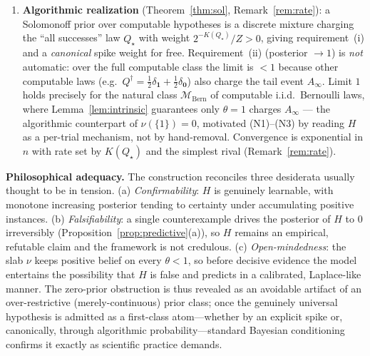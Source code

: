 \documentclass{amsart}
\theoremstyle{definition}
\begin{document}
\begin{enumerate}
\item \textbf{Algorithmic realization} (Theorem~\ref{thm:sol},
Remark~\ref{rem:rate}): a Solomonoff prior over computable hypotheses is a
discrete mixture charging the ``all successes'' law $Q_\star$ with weight
$2^{-K(Q_\star)}/Z>0$, giving requirement~(i) and a \emph{canonical} spike weight
for free. Requirement~(ii) (posterior $\to1$) is \emph{not} automatic: over the
full computable class the limit is $<1$ because other computable laws (e.g.\
$Q^{\dagger}=\tfrac12\delta_{\mathbf 1}+\tfrac12\delta_{\mathbf 0}$) also charge
the tail event $A_\infty$. Limit $1$ holds precisely for the natural class
$\mathcal M_{\mathrm{Bern}}$ of computable i.i.d.\ Bernoulli laws, where
Lemma~\ref{lem:intrinsic} guarantees only $\theta=1$ charges $A_\infty$ --- the
algorithmic counterpart of $\nu(\{1\})=0$, motivated (N1)--(N3) by reading $H$ as a
per-trial mechanism, not by hand-removal. Convergence is exponential in $n$ with
rate set by $K(Q_\star)$ and the simplest rival (Remark~\ref{rem:rate}).
\end{enumerate}

\noindent\textbf{Philosophical adequacy.} The construction reconciles three
desiderata usually thought to be in tension. (a) \emph{Confirmability}: $H$ is
genuinely learnable, with monotone increasing posterior tending to certainty
under accumulating positive instances. (b) \emph{Falsifiability}: a single
counterexample drives the posterior of $H$ to $0$ irreversibly
(Proposition~\ref{prop:predictive}(a)), so $H$ remains an empirical, refutable
claim and the framework is not credulous. (c) \emph{Open-mindedness}: the slab
$\nu$ keeps positive belief on every $\theta<1$, so before decisive evidence the
model entertains the possibility that $H$ is false and predicts in a calibrated,
Laplace-like manner. The zero-prior obstruction is thus revealed as an avoidable
artifact of an over-restrictive (merely-continuous) prior class; once the
genuinely universal hypothesis is admitted as a first-class atom---whether by an
explicit spike or, canonically, through algorithmic probability---standard
Bayesian conditioning confirms it exactly as scientific practice demands.
\end{document}
